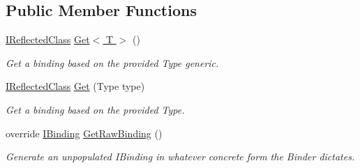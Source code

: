 \subsection*{Public Member Functions}
\begin{DoxyCompactItemize}
\item 
\hypertarget{classstrange_1_1extensions_1_1reflector_1_1impl_1_1_reflection_binder_a88758ee13a8a41175fb9bef395631485}{\hyperlink{interfacestrange_1_1extensions_1_1reflector_1_1api_1_1_i_reflected_class}{I\-Reflected\-Class} \hyperlink{classstrange_1_1extensions_1_1reflector_1_1impl_1_1_reflection_binder_a88758ee13a8a41175fb9bef395631485}{Get$<$ T $>$} ()}\label{classstrange_1_1extensions_1_1reflector_1_1impl_1_1_reflection_binder_a88758ee13a8a41175fb9bef395631485}

\begin{DoxyCompactList}\small\item\em Get a binding based on the provided Type generic. \end{DoxyCompactList}\item 
\hypertarget{classstrange_1_1extensions_1_1reflector_1_1impl_1_1_reflection_binder_a42e0e76fc92c1dd0cde7da2651408680}{\hyperlink{interfacestrange_1_1extensions_1_1reflector_1_1api_1_1_i_reflected_class}{I\-Reflected\-Class} \hyperlink{classstrange_1_1extensions_1_1reflector_1_1impl_1_1_reflection_binder_a42e0e76fc92c1dd0cde7da2651408680}{Get} (Type type)}\label{classstrange_1_1extensions_1_1reflector_1_1impl_1_1_reflection_binder_a42e0e76fc92c1dd0cde7da2651408680}

\begin{DoxyCompactList}\small\item\em Get a binding based on the provided Type. \end{DoxyCompactList}\item 
\hypertarget{classstrange_1_1extensions_1_1reflector_1_1impl_1_1_reflection_binder_a44c2bccba1baa33a8a91123ca88d30eb}{override \hyperlink{interfacestrange_1_1framework_1_1api_1_1_i_binding}{I\-Binding} \hyperlink{classstrange_1_1extensions_1_1reflector_1_1impl_1_1_reflection_binder_a44c2bccba1baa33a8a91123ca88d30eb}{Get\-Raw\-Binding} ()}\label{classstrange_1_1extensions_1_1reflector_1_1impl_1_1_reflection_binder_a44c2bccba1baa33a8a91123ca88d30eb}

\begin{DoxyCompactList}\small\item\em Generate an unpopulated I\-Binding in whatever concrete form the Binder dictates. \end{DoxyCompactList}\end{DoxyCompactItemize}
